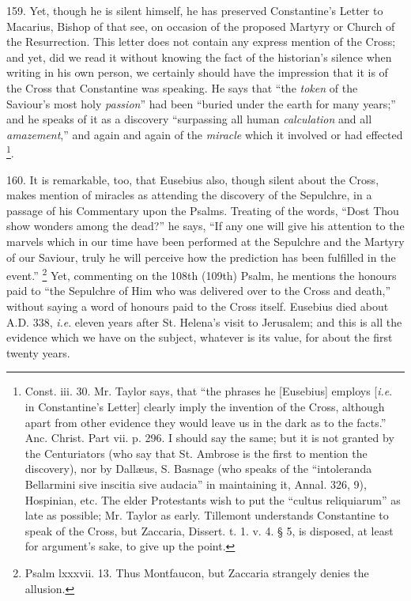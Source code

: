 159.
Yet, though he is silent himself, he has preserved Constantine's
Letter to Macarius, Bishop of that see, on occasion of the proposed
Martyry or Church of the Resurrection. This letter does not contain
any express mention of the Cross; and yet, did we read it without
knowing the fact of the historian's silence when writing in his own
person, we certainly should have the impression that it is of the
Cross that Constantine was speaking. He says that ``the \emph{token} of the
Saviour's most holy \emph{passion}'' had been ``buried under the earth
for many years;'' and he speaks of it as a discovery ``surpassing all
human \emph{calculation} and all \emph{amazement},'' and again and
again of the \emph{miracle} which it involved or had effected \footnote{Const. iii. 30. Mr. Taylor says, that ``the phrases he [Eusebius]
employs [\emph{i.e}. in Constantine's Letter] clearly imply the
invention of the Cross, although apart from other evidence they would
leave us in the dark as to the facts.'' Anc. Christ. Part vii. p. 296.
I should say the same; but it is not granted by the Centuriators (who
say that St. Ambrose is the first to mention the discovery), nor by
Dallæus, S. Basnage (who speaks of the ``intoleranda Bellarmini
sive inscitia sive audacia'' in maintaining it, Annal. 326, 9),
Hospinian, etc. The elder Protestants wish to put the ``cultus
reliquiarum'' as late as possible; Mr. Taylor as early. Tillemont
understands Constantine to speak of the Cross, but Zaccaria, Dissert.
t. 1. v. 4. § 5, is disposed, at least for argument's sake, to give
up the point.}.

160.
It is remarkable, too, that Eusebius also, though silent about the
Cross, makes mention of miracles as attending the discovery of the
Sepulchre, in a passage of his Commentary upon the Psalms. Treating of
the words, ``Dost Thou show wonders among the dead?'' he says, ``If any
one will give his attention to the marvels which in our time have been
performed at the Sepulchre and the Martyry of our Saviour, truly he
will perceive how the prediction has been fulfilled in the event.'' \footnote{Psalm lxxxvii. 13. Thus Montfaucon, but Zaccaria strangely denies the
allusion.} Yet, commenting on the 108th (109th) Psalm, he mentions the
honours paid to ``the Sepulchre of Him who was delivered over to
the Cross and death,'' without saying a word of honours paid to the
Cross itself. Eusebius died about A.D.
338, \emph{i.e}. eleven years after St. Helena's visit to Jerusalem;
and this is all the evidence which we have on the subject,
whatever is its value, for about the first twenty years.

